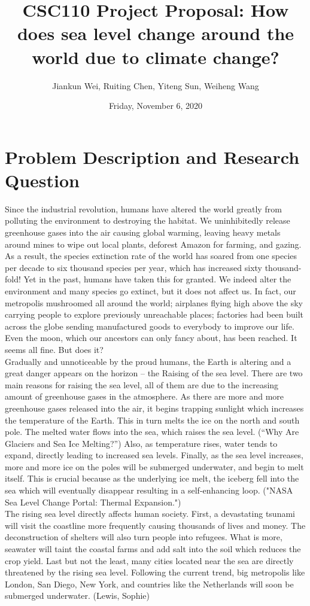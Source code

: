 \documentclass[fontsize=11pt]{article}
\title{CSC110 Project Proposal: How does sea level change around the world due to climate change?}
\author{Jiankun Wei, Ruiting Chen, Yiteng Sun, Weiheng Wang}
\date{Friday, November 6, 2020}
\begin{document}
\maketitle

\section*{Problem Description and Research Question}

Since the industrial revolution, humans have altered the world greatly from polluting the environment to destroying the habitat. We uninhibitedly release greenhouse gases into the air causing global warming, leaving heavy metals around mines to wipe out local plants, deforest Amazon for farming, and gazing. As a result, the species extinction rate of the world has soared from one species per decade to six thousand species per year, which has increased sixty thousand-fold! Yet in the past, humans have taken this for granted. We indeed alter the environment and many species go extinct, but it does not affect us. In fact, our metropolis mushroomed all around the world; airplanes flying high above the sky carrying people to explore previously unreachable places; factories had been built across the globe sending manufactured goods to everybody to improve our life. Even the moon, which our ancestors can only fancy about, has been reached. It seems all fine. But does it?\\
Gradually and unnoticeable by the proud humans, the Earth is altering and a great danger appears on the horizon -- the Raising of the sea level. There are two main reasons for raising the sea level, all of them are due to the increasing amount of greenhouse gases in the atmosphere. As there are more and more greenhouse gases released into the air, it begins trapping sunlight which increases the temperature of the Earth. This in turn melts the ice on the north and south pole. The melted water flows into the sea, which raises the sea level. (“Why Are Glaciers and Sea Ice Melting?”) Also, as temperature rises, water tends to expand, directly leading to increased sea levels. Finally, as the sea level increases, more and more ice on the poles will be submerged underwater, and begin to melt itself. This is crucial because as the underlying ice melt, the iceberg fell into the sea which will eventually disappear resulting in a self-enhancing loop. ("NASA Sea Level Change Portal: Thermal Expansion.")\\
The rising sea level directly affects human society. First, a devastating tsunami will visit the coastline more frequently causing thousands of lives and money. The deconstruction of shelters will also turn people into refugees. What is more, seawater will taint the coastal farms and add salt into the soil which reduces the crop yield. Last but not the least, many cities located near the sea are directly threatened by the rising sea level. Following the current trend, big metropolis like London, San Diego, New York, and countries like the Netherlands will soon be submerged underwater. (Lewis, Sophie)\\
\end{document}
